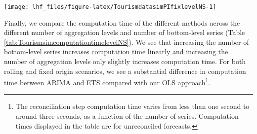 \documentclass[11pt,a4paper,]{article}
\let\origfigure\figure
\let\endorigfigure\endfigure
\renewenvironment{figure}[1][2] {
    \expandafter\origfigure\expandafter[!htbp]
} {
    \endorigfigure
}
\begin{document}
\begin{figure}

{\centering \texttt{[image: lhf\_files/figure-latex/TourismdatasimPIfixlevelNS-1]} 

}

\caption{Comparing reconciled fixed origin forecasts and prediction intervals for a sample bottom-level series, for different number of bottom-level series and hierarchy levels (different panels). Simulated series has error value 0.5 and 24 months test set.}\label{fig:TourismdatasimPIfixlevelNS}
\end{figure}

Finally, we compare the computation time of the different methods across the different number of aggregation levels and number of bottom-level series (Table \ref{tab:TourismsimcomputationtimelevelNS}). We see that increasing the number of bottom-level series increases computation time linearly and increasing the number of aggregation levels only slightly increases computation time. For both rolling and fixed origin scenarios, we see a substantial difference in computation time between ARIMA and ETS compared with our OLS approach\footnote{The reconciliation step computation time varies from less than one second to around three seconds, as a function of the number of series. Computation times displayed in the table are for unreconciled forecasts.}.
\end{document}
